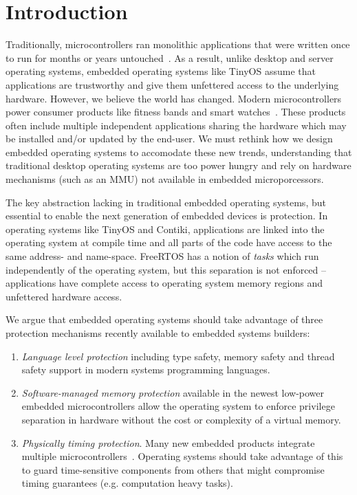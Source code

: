 \section{Introduction}

Traditionally, microcontrollers ran monolithic applications that were written
once to run for months or years untouched~. As a result,
unlike desktop and server operating systems, embedded operating systems like
TinyOS assume that applications are trustworthy and give them unfettered
access to the underlying hardware. However, we believe the world has changed.
Modern microcontrollers power consumer products like fitness bands and smart
watches~. These products often
include multiple independent applications sharing the hardware which may be
installed and/or updated by the end-user. We must rethink how we design
embedded operating systems to accomodate these new trends, understanding that
traditional desktop operating systems are too power hungry and rely on
hardware mechanisms (such as an MMU) not available in embedded
microporcessors.

The key abstraction lacking in traditional embedded operating systems, but
essential to enable the next generation of embedded devices is protection. In
operating systems like TinyOS and Contiki, applications are linked into the
operating system at compile time and all parts of the code have access to the
same address- and name-space. FreeRTOS has a notion of \emph{tasks} which run
independently of the operating system, but this separation is not enforced --
applications have complete access to operating system memory regions and
unfettered hardware access.

We argue that embedded operating systems should take advantage of three
protection mechanisms recently available to embedded systems builders:

\begin{enumerate}
  \item \emph{Language level protection} including type safety, memory safety
    and thread safety support in modern systems programming languages.
  \item \emph{Software-managed memory protection} available in the newest
    low-power embedded microcontrollers allow the operating system to enforce
    privilege separation in hardware without the cost or complexity of a virtual
    memory.
  \item \emph{Physically timing protection}. Many new embedded products
    integrate multiple microcontrollers~.
  Operating systems should take advantage of this to guard time-sensitive
  components from others that might compromise timing guarantees (e.g.
  computation heavy tasks).
\end{enumerate}

